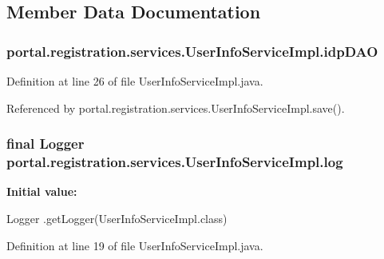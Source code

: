\subsection{Member Data Documentation}
\hypertarget{classportal_1_1registration_1_1services_1_1UserInfoServiceImpl_ac8ea4875443ac094d95e173e1c1dc4e9}{
\subsubsection[{idpDAO}]{ {\bf portal.registration.services.UserInfoServiceImpl.idpDAO}}}
\label{classportal_1_1registration_1_1services_1_1UserInfoServiceImpl_ac8ea4875443ac094d95e173e1c1dc4e9}


Definition at line 26 of file UserInfoServiceImpl.java.



Referenced by portal.registration.services.UserInfoServiceImpl.save().

\hypertarget{classportal_1_1registration_1_1services_1_1UserInfoServiceImpl_adfb7ee8105977d32b37b4c0cf804d493}{
\subsubsection[{log}]{\setlength{\rightskip}{0pt plus 5cm}final Logger {\bf portal.registration.services.UserInfoServiceImpl.log}}}
\label{classportal_1_1registration_1_1services_1_1UserInfoServiceImpl_adfb7ee8105977d32b37b4c0cf804d493}
{\bfseries Initial value:}
\begin{DoxyCode}
 Logger
                        .getLogger(UserInfoServiceImpl.class)
\end{DoxyCode}


Definition at line 19 of file UserInfoServiceImpl.java.



